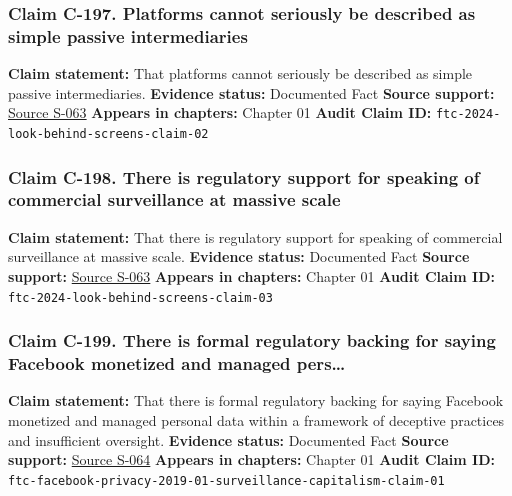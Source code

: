 \documentclass[
  american,
  11pt,
  letterpaper,
]{article}
\begin{document}
\subsubsection{Claim C-197. Platforms cannot seriously be described as
simple passive
intermediaries}\label{claim-c-197-platforms-cannot-seriously-be-described-as-simple-passive-intermediaries}

\textbf{Claim statement:} That platforms cannot seriously be described
as simple passive intermediaries. \textbf{Evidence status:} Documented
Fact \textbf{Source support:}
\hyperref[source-s-063-a-look-behind-the-screens-examining-the-data-practices-of-social-media-and-video-streaming-services]{Source
S-063} \textbf{Appears in chapters:} Chapter 01 \textbf{Audit Claim ID:}
\texttt{ftc-2024-look-behind-screens-claim-02}

\subsubsection{Claim C-198. There is regulatory support for speaking of
commercial surveillance at massive
scale}\label{claim-c-198-there-is-regulatory-support-for-speaking-of-commercial-surveillance-at-massive-scale}

\textbf{Claim statement:} That there is regulatory support for speaking
of commercial surveillance at massive scale. \textbf{Evidence status:}
Documented Fact \textbf{Source support:}
\hyperref[source-s-063-a-look-behind-the-screens-examining-the-data-practices-of-social-media-and-video-streaming-services]{Source
S-063} \textbf{Appears in chapters:} Chapter 01 \textbf{Audit Claim ID:}
\texttt{ftc-2024-look-behind-screens-claim-03}

\subsubsection{Claim C-199. There is formal regulatory backing for
saying Facebook monetized and managed
pers\ldots{}}\label{claim-c-199-there-is-formal-regulatory-backing-for-saying-facebook-monetized-and-managed-pers}

\textbf{Claim statement:} That there is formal regulatory backing for
saying Facebook monetized and managed personal data within a framework
of deceptive practices and insufficient oversight. \textbf{Evidence
status:} Documented Fact \textbf{Source support:}
\hyperref[source-s-064-ftc-imposes-5-billion-penalty-and-sweeping-new-privacy-restrictions-on-facebook]{Source
S-064} \textbf{Appears in chapters:} Chapter 01 \textbf{Audit Claim ID:}
\texttt{ftc-facebook-privacy-2019-01-surveillance-capitalism-claim-01}
\end{document}
